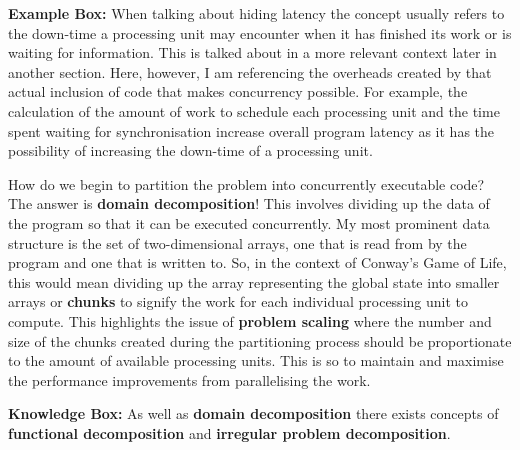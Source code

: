 \documentclass[11pt]{article} %
\begin{document}
\begin{mdframed}
{\bf Example Box:} When talking about hiding latency the concept usually refers to the down-time a processing unit may encounter when it has finished its work or is waiting for information. This is talked about in a more relevant context later in another section. Here, however, I am referencing the overheads created by that actual inclusion of code that makes concurrency possible. For example, the calculation of the amount of work to schedule each processing unit and the time spent waiting for synchronisation increase overall program latency as it has the possibility of increasing the down-time of a processing unit. 
\end{mdframed}
\bigskip
How do we begin to partition the problem into concurrently executable code? The answer is {\bf domain decomposition}! This involves dividing up the data of the program so that it can be executed concurrently. My most prominent data structure is the set of two-dimensional arrays, one that is read from by the program and one that is written to. So, in the context of Conway's Game of Life, this would mean dividing up the array representing the global state into smaller arrays or {\bf chunks} to signify the work for each individual processing unit to compute. This highlights the issue of {\bf problem scaling} where the number and size of the chunks created during the partitioning process should be proportionate to the amount of available processing units. This is so to maintain and maximise the performance improvements from parallelising the work. 
\bigskip
\begin{mdframed}
{\bf Knowledge Box:} As well as {\bf domain decomposition} there exists concepts of {\bf functional decomposition} and {\bf irregular problem decomposition}. 

\end{mdframed}
\end{document}
